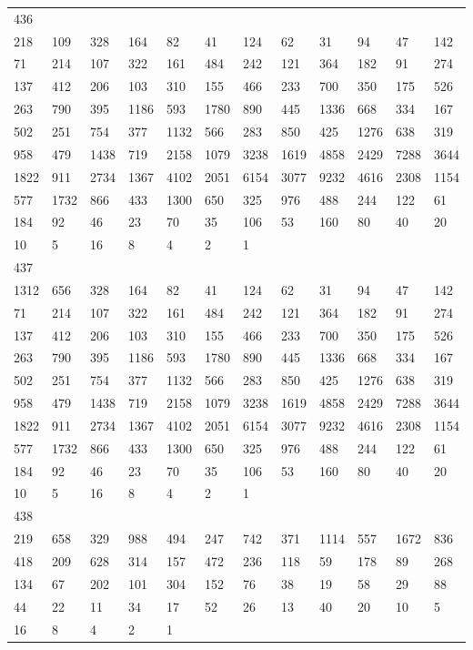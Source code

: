 \begin{longtable}{llllllllllll}
436&&&&&&&&&&&\\
218& 109& 328& 164& 82& 41& 124& 62& 31& 94& 47& 142\\
71& 214& 107& 322& 161& 484& 242& 121& 364& 182& 91& 274\\
137& 412& 206& 103& 310& 155& 466& 233& 700& 350& 175& 526\\
263& 790& 395& 1186& 593& 1780& 890& 445& 1336& 668& 334& 167\\
502& 251& 754& 377& 1132& 566& 283& 850& 425& 1276& 638& 319\\
958& 479& 1438& 719& 2158& 1079& 3238& 1619& 4858& 2429& 7288& 3644\\
1822& 911& 2734& 1367& 4102& 2051& 6154& 3077& 9232& 4616& 2308& 1154\\
577& 1732& 866& 433& 1300& 650& 325& 976& 488& 244& 122& 61\\
184& 92& 46& 23& 70& 35& 106& 53& 160& 80& 40& 20\\
10& 5& 16& 8& 4& 2& 1& \\

437&&&&&&&&&&&\\
1312& 656& 328& 164& 82& 41& 124& 62& 31& 94& 47& 142\\
71& 214& 107& 322& 161& 484& 242& 121& 364& 182& 91& 274\\
137& 412& 206& 103& 310& 155& 466& 233& 700& 350& 175& 526\\
263& 790& 395& 1186& 593& 1780& 890& 445& 1336& 668& 334& 167\\
502& 251& 754& 377& 1132& 566& 283& 850& 425& 1276& 638& 319\\
958& 479& 1438& 719& 2158& 1079& 3238& 1619& 4858& 2429& 7288& 3644\\
1822& 911& 2734& 1367& 4102& 2051& 6154& 3077& 9232& 4616& 2308& 1154\\
577& 1732& 866& 433& 1300& 650& 325& 976& 488& 244& 122& 61\\
184& 92& 46& 23& 70& 35& 106& 53& 160& 80& 40& 20\\
10& 5& 16& 8& 4& 2& 1& \\

438&&&&&&&&&&&\\
219& 658& 329& 988& 494& 247& 742& 371& 1114& 557& 1672& 836\\
418& 209& 628& 314& 157& 472& 236& 118& 59& 178& 89& 268\\
134& 67& 202& 101& 304& 152& 76& 38& 19& 58& 29& 88\\
44& 22& 11& 34& 17& 52& 26& 13& 40& 20& 10& 5\\
16& 8& 4& 2& 1& \\


\end{longtable}
